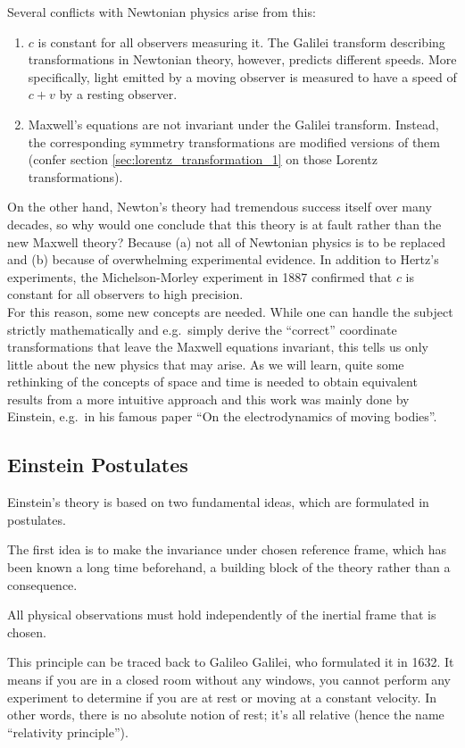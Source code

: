 Several conflicts with Newtonian physics arise from this:
\begin{enumerate}
	\item $c$ is constant for all observers measuring it. The Galilei transform describing transformations in Newtonian theory, however, predicts different speeds. More specifically, light emitted by a moving observer is measured to have a speed of $c + v$ by a resting observer.


	\item Maxwell's equations are not invariant under the Galilei transform. Instead, the corresponding symmetry transformations are modified versions of them (confer section \ref{sec:lorentz_transformation_1} on those Lorentz transformations).
\end{enumerate}

On the other hand, Newton's theory had tremendous success itself over many decades, so why would one conclude that this theory is at fault rather than the new Maxwell theory? Because (a) not all of Newtonian physics is to be replaced and (b) because of overwhelming experimental evidence. In addition to Hertz's experiments, the Michelson-Morley experiment in 1887 confirmed that $c$ is constant for all observers to high precision.\\


For this reason, some new concepts are needed. While one can handle the subject strictly mathematically and e.g.~simply derive the \enquote{correct} coordinate transformations that leave the Maxwell equations invariant, this tells us only little about the new physics that may arise. As we will learn, quite some rethinking of the concepts of space and time is needed to obtain equivalent results from a more intuitive approach and this work was mainly done by Einstein, e.g.~in his famous paper \enquote{On the electrodynamics of moving bodies}.



		\subsection{Einstein Postulates}
Einstein's theory is based on two fundamental ideas, which are formulated in postulates.

The first idea is to make the invariance under chosen reference frame, which has been known a long time beforehand, a building block of the theory rather than a consequence.
\begin{post}
	All physical observations must hold independently of the inertial frame that is chosen.
\end{post}
This principle can be traced back to Galileo Galilei, who formulated it in 1632. It means if you are in a closed room without any windows, you cannot perform any experiment to determine if you are at rest or moving at a constant velocity. In other words, there is no absolute notion of rest; it's all relative (hence the name \enquote{relativity principle}).\\


